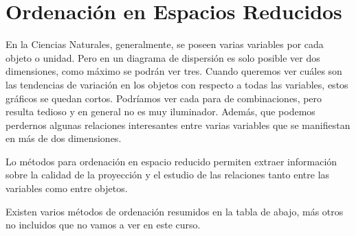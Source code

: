 \documentclass[]{book}
\theoremstyle{definition}
\theoremstyle{definition}
\theoremstyle{definition}
\theoremstyle{remark}
\begin{document}
\hypertarget{ordenacion-en-espacios-reducidos}{%
\chapter{Ordenación en Espacios
Reducidos}\label{ordenacion-en-espacios-reducidos}}

En la Ciencias Naturales, generalmente, se poseen varias variables por
cada objeto o unidad. Pero en un diagrama de dispersión es solo posible
ver dos dimensiones, como máximo se podrán ver tres. Cuando queremos ver
cuáles son las tendencias de variación en los objetos con respecto a
todas las variables, estos gráficos se quedan cortos. Podríamos ver cada
para de combinaciones, pero resulta tedioso y en general no es muy
iluminador. Además, que podemos perdernos algunas relaciones
interesantes entre varias variables que se manifiestan en más de dos
dimensiones.

Lo métodos para ordenación en espacio reducido permiten extraer
información sobre la calidad de la proyección y el estudio de las
relaciones tanto entre las variables como entre objetos.

Existen varios métodos de ordenación resumidos en la tabla de abajo, más
otros no incluidos que no vamos a ver en este curso.
\end{document}
